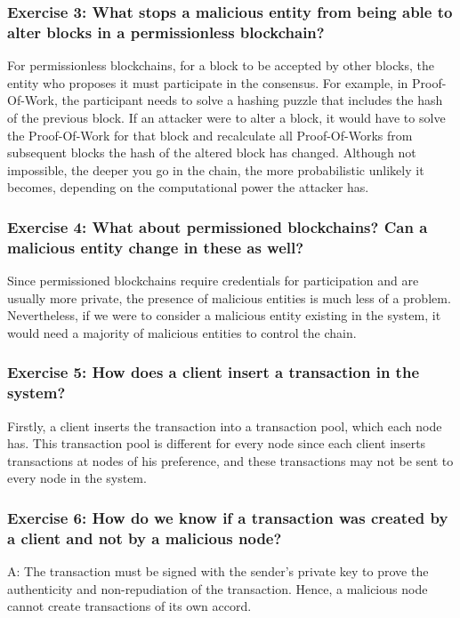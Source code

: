 \documentclass[12pt,a4paper]{article}
\begin{document}
\subsubsection*{Exercise 3: What stops a malicious entity from being able to alter blocks in a permissionless blockchain?}

For permissionless blockchains, for a block to be accepted by other blocks, the entity who proposes it must participate in the consensus. For example, in Proof-Of-Work, the participant needs to solve a hashing puzzle that includes the hash of the previous block. If an attacker were to alter a block, it would have to solve the Proof-Of-Work for that block and recalculate all Proof-Of-Works from subsequent blocks the hash of the altered block has changed. Although not impossible, the deeper you go in the chain, the more probabilistic unlikely it becomes, depending on the computational power the attacker has.


\subsubsection*{Exercise 4: What about permissioned blockchains? Can a malicious entity change in these as well?}

Since permissioned blockchains require credentials for participation and are usually more private, the presence of malicious entities is much less of a problem. Nevertheless, if we were to consider a malicious entity existing in the system, it would need a majority of malicious entities to control the chain.


\subsubsection*{Exercise 5: How does a client insert a transaction in the system?
}

Firstly, a client inserts the transaction into a transaction pool, which each node has. This transaction pool is different for every node since each client inserts transactions at nodes of his preference, and these transactions may not be sent to every node in the system.

\subsubsection*{Exercise 6: How do we know if a transaction was created by a client and not by a malicious node?}
A: The transaction must be signed with the sender's private key to prove the authenticity and non-repudiation of the transaction. Hence, a malicious node cannot create transactions of its own accord.
\end{document}
